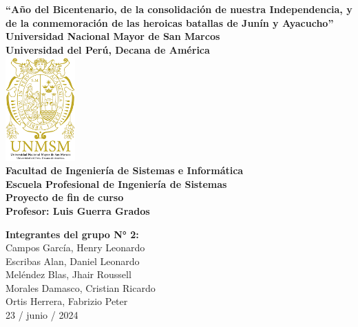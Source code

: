 \begin{titlepage}
    \begin{center}
        \textbf{\large “Año del Bicentenario, de la consolidación de nuestra Independencia, y de la conmemoración de las heroicas batallas de Junín y Ayacucho”}\\
        \vspace{0.5cm}
        \textbf{\large Universidad Nacional Mayor de San Marcos}\\
        \vspace{0.5cm}
        \textbf{\large Universidad del Perú, Decana de América}\\
        \vspace{0.5cm}
        \includegraphics[height=4cm]{unmsm.png}\\ %
        \vspace{5mm}
        \textbf{\large Facultad de Ingeniería de Sistemas e Informática}\\
        \vspace{0.5cm}
        \textbf{\large Escuela Profesional de Ingeniería de Sistemas}\\
        \vspace{0.5cm}
        \textbf{\large Proyecto de fin de curso}\\
        \vspace{0.5cm}
        \textbf{\large Profesor: Luis Guerra Grados}\\
        \vspace{1cm}
    \end{center}

    \begin{center}
        \textbf{\large Integrantes del grupo N° 2:}\\
        \vspace{0.5cm}
        {\large Campos García, Henry Leonardo}\\
        \vspace{0.3cm}
        {\large Escribas Alan, Daniel Leonardo}\\
        \vspace{0.3cm}
        {\large Meléndez Blas, Jhair Roussell}\\
        \vspace{0.3cm}
        {\large Morales Damasco, Cristian Ricardo}\\
        \vspace{0.3cm}
        {\large Ortis Herrera, Fabrizio Peter}\\
        \vspace{1cm}
        {\large 23 / junio / 2024}
    \end{center}
\end{titlepage}
